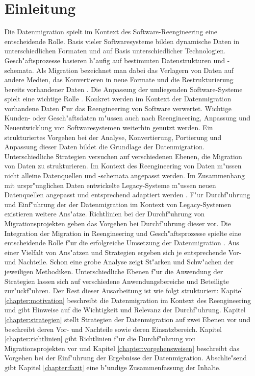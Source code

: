 \section{Einleitung}
\label{chapter:einleitung}


Die Datenmigration spielt im Kontext des Software-Reengineering eine entscheidende Rolle. Basis vieler Softwaresysteme bilden dynamische Daten in unterschiedlichen Formaten und auf Basis unterschiedlicher Technologien. Gesch"aftsprozesse basieren h"aufig auf bestimmten Datenstrukturen und -schemata. Als Migration bezeichnet man dabei das Verlagern von Daten auf andere Medien, das Konvertieren in neue Formate und die Restrukturierung bereits vorhandener Daten \citep{morris-2012}. Die Anpassung der umliegenden Software-Systeme spielt eine wichtige Rolle \citep{henrard-2002}.
\lb
Konkret werden im Kontext der Datenmigration vorhandene Daten f"ur das Reengineering von Software verwertet. Wichtige Kunden- oder Gesch"aftsdaten m"ussen auch nach Reengineering, Anpassung und Neuentwicklung von Softwaresystemen weiterhin genutzt werden. Ein strukturiertes Vorgehen bei der Analyse, Konvertierung, Portierung und Anpassung dieser Daten bildet die Grundlage der Datenmigration.  
\lb
Unterschiedliche Strategien versuchen auf verschiedenen Ebenen, die Migration von Daten zu strukturieren. Im Kontext des Reengineering von Daten m"ussen nicht alleine Datenquellen und -schemata angepasst werden. Im Zusammenhang mit urspr"unglichen Daten entwickelte Legacy-Systeme m"ussen neuen Datenquellen angepasst und entsprechend adaptiert werden \citep{henrard-2002}.	
\lb
F"ur Durchf"uhrung und Einf"uhrung der der Datenmigration im Kontext von Legacy-Systemen existieren weitere Ans"atze. Richtlinien bei der Durchf"uhrung von Migrationsprojekten geben das Vorgehen bei Durchf"uhrung dieser vor. Die Integration der Migration in Reengineering und Gesch"aftsprozesse spielte eine entscheidende Rolle f"ur die erfolgreiche Umsetzung der Datenmigration \citep{wuLawless-1997} \citep{ackermann-2005}.
\lb
Aus einer Vielfalt von Ans"atzen und Strategien ergeben sich je entsprechende Vor- und Nachteile. Schon eine grobe Analyse zeigt St"arken und Schw"achen der jeweiligen Methodiken. Unterschiedliche Ebenen f"ur die Anwendung der Strategien lassen sich auf verschiedene Anwendungsbereiche und Beteiligte zur"uckf"uhren.
\lb
Der Rest dieser Ausarbeitung ist wie folgt strukturiert: Kapitel \ref{chapter:motivation} beschreibt die Datenmigration im Kontext des Reengineering und gibt Hinweise auf die Wichtigkeit und Relevanz der Durchf"uhrung. Kapitel \ref{chapter:strategien} stellt Strategien der Datenmigration auf zwei Ebenen vor und beschreibt deren Vor- und Nachteile sowie deren Einsatzbereich. Kapitel \ref{chapter:richtlinien} gibt Richtlinien f"ur die Durchf"uhrung von Migrationsprojekten vor und Kapitel \ref{chapter:vorgehensweisen} beschreibt das Vorgehen bei der Einf"uhrung der Ergebnisse der Datenmigration. Abschlie"send gibt Kapitel \ref{chapter:fazit} eine b"undige Zusammenfassung der Inhalte.